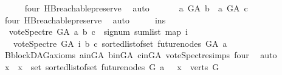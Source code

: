 \begin{isabellebody}
\ \ \ \ \isamarkupfalse%
\ four\ HB{}{\isachardot}{\kern0pt}reachable{}{\isacharunderscore}{\kern0pt}preserve\ \isamarkupfalse%
\ auto\isanewline
\ \ \isamarkupfalse%
\ \isamarkupfalse%
\ {\isachardoublequoteopen}{\isasymnot}\ {\isacharparenleft}{\kern0pt}a\ {\isasymrightarrow}\isactrlsup {\isacharplus}{\kern0pt}\isactrlbsub G{\isacharunderscore}{\kern0pt}A\isactrlesub \ b\ {\isasymand}\ a\ {\isasymrightarrow}\isactrlsup {\isacharplus}{\kern0pt}\isactrlbsub G{\isacharunderscore}{\kern0pt}A\isactrlesub \ c{\isacharparenright}{\kern0pt}{\isachardoublequoteclose}\ \isamarkupfalse%
\ four\ HB{}{\isachardot}{\kern0pt}reachable{}{\isacharunderscore}{\kern0pt}preserve\ \isamarkupfalse%
\ auto\isanewline
\ \ \isamarkupfalse%
\ \isamarkupfalse%
\ ins{}{\isacharcolon}{\kern0pt}\isanewline
\ \ {\isachardoublequoteopen}vote{\isacharunderscore}{\kern0pt}Spectre\ G{\isacharunderscore}{\kern0pt}A\ a\ b\ c\ {\isacharequal}{\kern0pt}\ signum\ {\isacharparenleft}{\kern0pt}sum{\isacharunderscore}{\kern0pt}list\ {\isacharparenleft}{\kern0pt}map\ {\isacharparenleft}{\kern0pt}{\isasymlambda}i{\isachardot}{\kern0pt}\isanewline
\ \ \ {\isacharparenleft}{\kern0pt}vote{\isacharunderscore}{\kern0pt}Spectre\ G{\isacharunderscore}{\kern0pt}A\ i\ b\ c{\isacharparenright}{\kern0pt}{\isacharparenright}{\kern0pt}\ {\isacharparenleft}{\kern0pt}sorted{\isacharunderscore}{\kern0pt}list{\isacharunderscore}{\kern0pt}of{\isacharunderscore}{\kern0pt}set\ {\isacharparenleft}{\kern0pt}future{\isacharunderscore}{\kern0pt}nodes\ G{\isacharunderscore}{\kern0pt}A\ a{\isacharparenright}{\kern0pt}{\isacharparenright}{\kern0pt}{\isacharparenright}{\kern0pt}{\isacharparenright}{\kern0pt}{\isachardoublequoteclose}\isanewline
\ \ \ \ \isamarkupfalse%
\ B{}{\isachardot}{\kern0pt}blockDAG{\isacharunderscore}{\kern0pt}axioms\ a{\isacharunderscore}{\kern0pt}in{\isacharunderscore}{\kern0pt}G{\isacharunderscore}{\kern0pt}A\ b{\isacharunderscore}{\kern0pt}in{\isacharunderscore}{\kern0pt}G{\isacharunderscore}{\kern0pt}A\ c{\isacharunderscore}{\kern0pt}in{\isacharunderscore}{\kern0pt}G{\isacharunderscore}{\kern0pt}A\ vote{\isacharunderscore}{\kern0pt}Spectre{\isachardot}{\kern0pt}simps\ four\ \isamarkupfalse%
\ auto\isanewline
\ \ \isamarkupfalse%
\ {\isachardoublequoteopen}{\isasymAnd}x\ {\isachardot}{\kern0pt}\ x\ {\isasymin}\ set\ {\isacharparenleft}{\kern0pt}sorted{\isacharunderscore}{\kern0pt}list{\isacharunderscore}{\kern0pt}of{\isacharunderscore}{\kern0pt}set\ {\isacharparenleft}{\kern0pt}future{\isacharunderscore}{\kern0pt}nodes\ G\ a{\isacharparenright}{\kern0pt}{\isacharparenright}{\kern0pt}\ {\isasymLongrightarrow}\ \ x\ {\isasymin}\ verts\ G\isanewline

\end{isabellebody}
